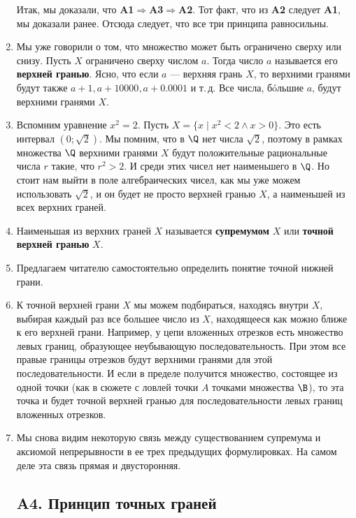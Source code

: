 \begin{enumerate}
Итак, мы доказали, что \textbf{A1}$\Rightarrow$\textbf{A3}$\Rightarrow$\textbf{A2}. Тот факт, что из \textbf{A2} следует \textbf{A1}, мы доказали ранее. Отсюда следует, что все три принципа равносильны.
\epf

\item Мы уже говорили о том, что множество может быть ограничено сверху или снизу. Пусть $X$ ограничено сверху числом $a$. Тогда число $a$ называется его \textbf{верхней гранью}. Ясно, что если $a$ --- верхняя грань $X$, то верхними гранями будут также $a+1, a+10000, a+0.0001$  и т.\,д. Все числа, б\'oльшие $a$, будут верхними гранями $X$.
\item Вспомним уравнение $x^2=2$. Пусть $X=\{x\mid x^2<2\land x>0\}$. Это есть интервал $(0;\sqrt 2)$. Мы помним, что в $\Q$ нет числа $\sqrt 2$, поэтому в рамках множества $\Q$ верхними гранями $X$ будут положительные рациональные числа $r$ такие, что $r^2>2$. И среди этих чисел нет наименьшего в $\Q$. Но стоит нам выйти в поле алгебраических чисел, как мы уже можем использовать $\sqrt 2$, и он будет не просто верхней гранью $X$, а наименьшей из всех верхних граней.
\item Наименьшая из верхних граней $X$ называется \textbf{супремумом} $X$ или \textbf{точной верхней гранью} $X$.
\item Предлагаем читателю самостоятельно определить понятие точной нижней грани.
\item К точной верхней грани $X$ мы можем подбираться, находясь внутри $X$, выбирая каждый раз все большее число из $X$, находящееся как можно ближе к его верхней грани. Например, у цепи вложенных отрезков есть множество левых границ, образующее неубывающую последовательность. При этом все правые границы отрезков будут верхними гранями для этой последовательности. И если в пределе получится множество, состоящее из одной точки (как в сюжете с ловлей точки $A$ точками множества $\B$), то эта точка и будет точной верхней гранью для последовательности левых границ вложенных отрезков.
\item Мы снова видим некоторую связь между существованием супремума и аксиомой непрерывности в ее трех предыдущих формулировках. На самом деле эта связь прямая и двусторонняя.

\subsection*{A4. Принцип точных граней}


\end{enumerate}
